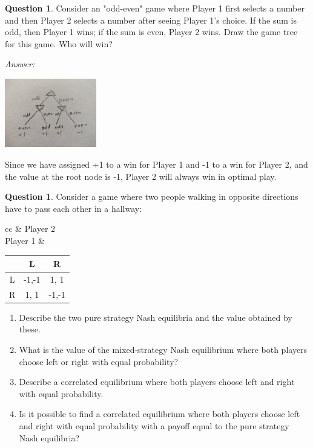 \documentclass{article}
\theoremstyle{definition}
\newtheorem{question}[thm]{Question}
\newenvironment{answer}{\noindent\textit{Answer:}}{}
\begin{document}
\begin{question}
    Consider an "odd-even" game where Player 1 first selects a number and then Player 2 selects a number after seeing Player 1's choice. If the sum is odd, then Player 1 wins; if the sum is even, Player 2 wins. Draw the game tree for this game. Who will win?
\end{question}

\begin{answer}

    \includegraphics[width=0.3\textwidth]{odd-even-tree.jpg}
    
    Since we have assigned +1 to a win for Player 1 and -1 to a win for Player 2, and the value at the root node is -1, Player 2 will always win in optimal play.
\end{answer}

\begin{question}
    Consider a game where two people walking in opposite directions have to pass each other in a hallway:

\begin{tabular}{cc}
& Player 2 \\
    Player 1 &
    \begin{tabular}{c|c|c|}
          & L & R \\\hline
        L & -1,-1 & 1, 1 \\ \hline
        R & 1, 1 & -1,-1 \\ \hline
    \end{tabular}
\end{tabular}

\begin{enumerate}
    \item Describe the two pure strategy Nash equilibria and the value obtained by these.
    \item What is the value of the mixed-strategy Nash equilibrium where both players choose left or right with equal probability?
    \item Describe a correlated equilibrium where both players choose left and right with equal probability.
    \item Is it possible to find a correlated equilibrium where both players choose left and right with equal probability with a payoff equal to the pure strategy Nash equilibria?
\end{enumerate}

\end{question}
\end{document}
